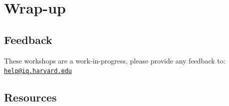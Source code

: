 \documentclass[]{book}
\begin{document}
\hypertarget{wrap-up-1}{%
\section{Wrap-up}\label{wrap-up-1}}

\hypertarget{feedback-1}{%
\subsection{Feedback}\label{feedback-1}}

These workshops are a work-in-progress, please provide any feedback to: \href{mailto:help@iq.harvard.edu}{\nolinkurl{help@iq.harvard.edu}}

\hypertarget{resources-2}{%
\subsection{Resources}\label{resources-2}}
\end{document}
